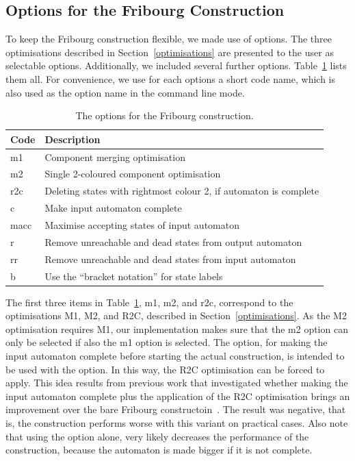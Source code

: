 \subsection{Options for the Fribourg Construction}
To keep the Fribourg construction flexible, we made use of options. The three optimisations described in Section~\ref{optimisations} are presented to the user as selectable options. Additionally, we included several further options. Table~\ref{goal_fribourg_options} lists them all. For convenience, we use for each options a short code name, which is also used as the option name in the command line mode.

\begin{table}
\caption{The options for the Fribourg construction.}
\begin{center}
\begin{tabular}{|l|l|}
\hline
Code & Description \\ \hline
m1 & Component merging optimisation \\ \hline
m2 & Single 2-coloured component optimisation \\ \hline
r2c & Deleting states with rightmost colour 2, if automaton is complete \\ \hline
c & Make input automaton complete \\ \hline
macc & Maximise accepting states of input automaton \\ \hline
r & Remove unreachable and dead states from output automaton \\ \hline
rr & Remove unreachable and dead states from input automaton \\ \hline
b & Use the ``bracket notation'' for state labels \\ \hline
\end{tabular}
\end{center}
\label{goal_fribourg_options}
\end{table}

The first three items in Table~\ref{goal_fribourg_options}, m1, m2, and r2c, correspond to the optimisations M1, M2, and R2C, described in Section~\ref{optimisations}. As the M2 optimisation requires M1, our implementation makes sure that the m2 option can only be selected if also the m1 option is selected. The  option, for making the input automaton complete before starting the actual construction, is intended to be used with the  option. In this way, the R2C optimisation can be forced to apply. This idea results from previous work that investigated whether making the input automaton complete plus the application of the R2C optimisation brings an improvement over the bare Fribourg constructoin~\cite{2013_bsc_goettel}. The result was negative, that is, the construction performs worse with this variant on practical cases. Also note that using the  option alone, very likely decreases the performance of the construction, because the automaton is made bigger if it is not complete.

